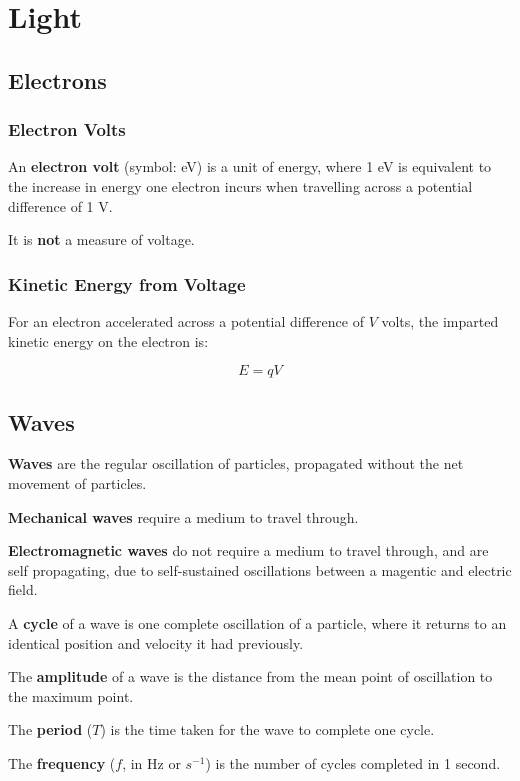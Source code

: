 \documentclass[a4paper,11pt]{report}
\begin{document}
\chapter{Light}

\section{Electrons}

\subsection{Electron Volts}

An \textbf{electron volt} (symbol: eV) is a unit of energy, where 1 eV is
equivalent to the increase in energy one electron incurs when travelling across
a potential difference of 1 V.

It is \textbf{not} a measure of voltage.

\subsection{Kinetic Energy from Voltage}

For an electron accelerated across a potential difference of $V$ volts, the
imparted kinetic energy on the electron is:

$$
E = qV
$$


\section{Waves}

\textbf{Waves} are the regular oscillation of particles, propagated without the
net movement of particles.

\textbf{Mechanical waves} require a medium to travel through.

\textbf{Electromagnetic waves} do not require a medium to travel through, and
are self propagating, due to self-sustained oscillations between a magentic and
electric field.

A \textbf{cycle} of a wave is one complete oscillation of a particle, where it
returns to an identical position and velocity it had previously.

The \textbf{amplitude} of a wave is the distance from the mean point of
oscillation to the maximum point.

The \textbf{period} ($T$) is the time taken for the wave to complete one cycle.

The \textbf{frequency} ($f$, in Hz or $s^{-1}$) is the number of cycles
completed in 1 second.
\end{document}
